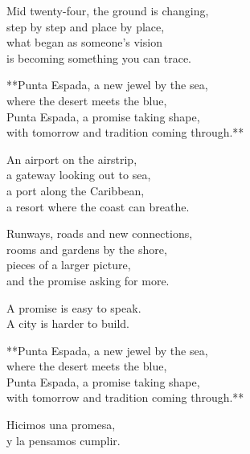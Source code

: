 \begin{lyrics}

Mid twenty-four, the ground is changing,\\
step by step and place by place,\\
what began as someone's vision\\
is becoming something you can trace.


**Punta Espada, a new jewel by the sea,\\
where the desert meets the blue,\\
Punta Espada, a promise taking shape,\\
with tomorrow and tradition coming through.**


An airport on the airstrip,\\
a gateway looking out to sea,\\
a port along the Caribbean,\\
a resort where the coast can breathe.

Runways, roads and new connections,\\
rooms and gardens by the shore,\\
pieces of a larger picture,\\
and the promise asking for more.


A promise is easy to speak.\\
A city is harder to build.


**Punta Espada, a new jewel by the sea,\\
where the desert meets the blue,\\
Punta Espada, a promise taking shape,\\
with tomorrow and tradition coming through.**


Hicimos una promesa,\\
y la pensamos cumplir.
\end{lyrics}

